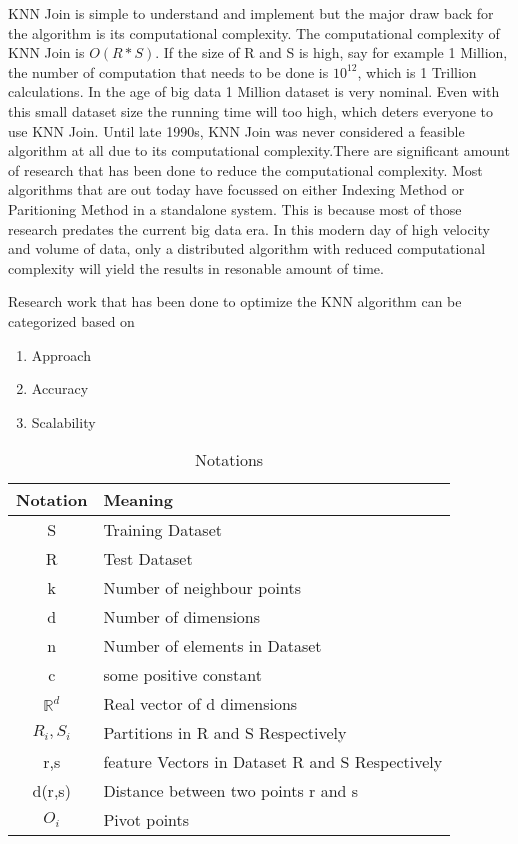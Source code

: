 KNN Join is simple to understand and implement but the major draw back
for the algorithm is its computational complexity. The computational
complexity of KNN Join is $ O(R*S)$. If the size of R and S is high,
say for example 1 Million, the number of computation that needs to be
done is $10^{12}$, which is 1 Trillion calculations. In the age of big data 1
Million dataset is very nominal. Even with this small dataset size the
running time will too high, which
deters everyone to use KNN Join. Until late 1990s, KNN Join was
never considered a feasible algorithm at all due to its computational
complexity.There are significant amount of research that has been done to reduce the
computational complexity. Most algorithms that are out today have focussed
on either Indexing Method or Paritioning Method in a standalone system. This is because most of those research predates the
current big data era. In this modern day of high velocity and volume of data,
only a distributed algorithm with reduced computational complexity will yield the results in resonable amount of time.

Research work that has been done to optimize the KNN algorithm can be categorized based on
\begin{enumerate}
\item Approach
\item Accuracy
\item Scalability
\end{enumerate}


\begin{table}[!t]
\caption{Notations}
\label{notations}
\centering
\begin{tabular}{|c|l|}
\hline
Notation & Meaning \\
\hline
S & Training Dataset \\

R & Test Dataset\\

k & Number of neighbour points \\

d & Number of dimensions \\

n & Number of elements in Dataset \\

c & some positive constant \\

$\mathbb{R}^d$ & Real vector of d dimensions \\

$R_i, S_i$ & Partitions in R and S Respectively \\

r,s & feature Vectors in Dataset R and S Respectively \\

d(r,s) & Distance between two points r and s \\

$O_i$ & Pivot points \\

\hline
\end{tabular}
\end{table}

